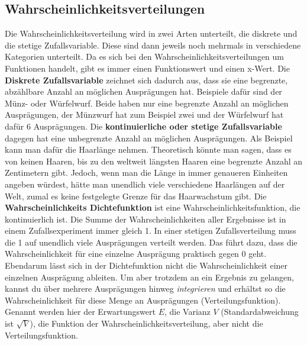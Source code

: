 \documentclass[letterpaper, titlepage]{article}
\begin{document}
\subsection{Wahrscheinlichkeitsverteilungen}\label{Wahrscheinlichkeitsverteilungen} Die Wahrscheinlichkeitsverteilung wird in zwei Arten unterteilt, die diskrete und die stetige Zufallsvariable. Diese sind dann jeweils noch mehrmals in verschiedene Kategorien unterteilt. Da es sich bei den Wahrscheinlichkeitsverteilungen um Funktionen handelt, gibt es immer einen Funktionswert und einen x-Wert.
Die \textbf{Diskrete Zufallsvariable} zeichnet sich dadurch aus, dass sie eine begrenzte, abzählbare Anzahl an möglichen Ausprägungen hat. Beispiele dafür sind der Münz- oder Würfelwurf. Beide haben nur eine begrenzte Anzahl an möglichen Ausprägungen, der Münzwurf hat zum Beispiel zwei und der Würfelwurf hat dafür 6 Ausprägungen. Die \textbf{kontinuierliche oder stetige Zufallsvariable} dagegen hat eine unbegrenzte Anzahl an möglichen Ausprägungen. Als Beispiel kann man dafür die Haarlänge nehmen. Theoretisch könnte man sagen, dass es von keinen Haaren, bis zu den weltweit längsten Haaren eine begrenzte Anzahl an Zentimetern gibt. Jedoch, wenn man die Länge in immer genaueren Einheiten angeben würdest, hätte man unendlich viele verschiedene Haarlängen auf der Welt, zumal es keine festgelegte Grenze für das Haarwachstum gibt. Die \textbf{Wahrscheinlichkeits Dichtefunktion} ist eine Wahrscheinlichkeitsfunktion, die kontinuierlich ist. Die Summe der Wahrscheinlichkeiten aller Ergebnisse ist in einem Zufallsexperiment immer gleich 1. In einer stetigen Zufallsverteilung muss die 1 auf unendlich viele Ausprägungen verteilt werden. Das führt dazu, dass die Wahrscheinlichkeit für eine einzelne Ausprägung praktisch gegen 0 geht. Ebendarum lässt sich in der Dichtefunktion nicht die Wahrscheinlichkeit einer einzelnen Ausprägung ableiten. Um aber trotzdem an ein Ergebnis zu gelangen, kannst du über mehrere Ausprägungen hinweg \textit{integrieren} und erhältst so die Wahrscheinlichkeit für diese Menge an Ausprägungen (Verteilungsfunktion). Genannt werden hier der Erwartungswert $E$, die Varianz $V$ (Standardabweichung ist $\sqrt V$), die Funktion der Wahrscheinlichkeitsverteilung, aber nicht die Verteilungsfunktion.

\vspace{0.35cm}
\end{document}
